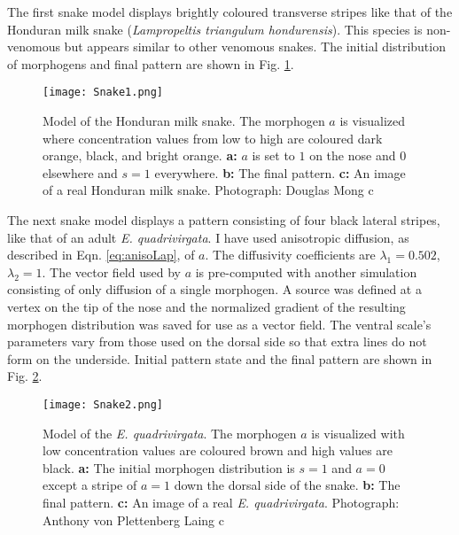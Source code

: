 \newpage
The first snake model displays brightly coloured transverse stripes like that of the Honduran milk snake (\textit{Lampropeltis triangulum hondurensis}). This species is non-venomous but appears similar to other venomous snakes. The initial distribution of morphogens and final pattern are shown in Fig. \ref{fig:Snake1}.

\begin{figure}[ht]
	\centering
	\texttt{[image: Snake1.png]}
	\caption{Model of the Honduran milk snake. The morphogen $a$ is visualized where concentration values from low to high are coloured dark orange, black, and bright orange. \textbf{a:} $a$ is set to $1$ on the nose and $0$ elsewhere and $s=1$ everywhere. \textbf{b:} The final pattern. \textbf{c:} An image of a real Honduran milk snake. \textcolor{citation-gray}{Photograph: Douglas Mong \textcircled{c}}}
	\label{fig:Snake1}
\end{figure}

The next snake model displays a pattern consisting of four black lateral stripes, like that of an adult \textit{E. quadrivirgata}. I have used anisotropic diffusion, as described in Eqn. \ref{eq:anisoLap}, of $a$. The diffusivity coefficients are $\lambda_{1}=0.502$, $\lambda_{2}=1$. The vector field used by $a$ is pre-computed with another simulation consisting of only diffusion of a single morphogen. A source was defined at a vertex on the tip of the nose and the normalized gradient of the resulting morphogen distribution was saved for use as a vector field. The ventral scale's parameters vary from those used on the dorsal side so that extra lines do not form on the underside. Initial pattern state and the final pattern are shown in Fig. \ref{fig:Snake2}.

\begin{figure}[ht]
	\centering
	\texttt{[image: Snake2.png]}
	\caption{Model of the \textit{E. quadrivirgata}. The morphogen $a$ is visualized with low concentration values are coloured brown and high values are black. \textbf{a:} The initial morphogen distribution is $s=1$ and $a=0$ except a stripe of $a=1$ down the dorsal side of the snake. \textbf{b:} The final pattern. \textbf{c:} An image of a real \textit{E. quadrivirgata}. \textcolor{citation-gray}{Photograph: Anthony von Plettenberg Laing \textcircled{c}}}
	\label{fig:Snake2}
\end{figure}

